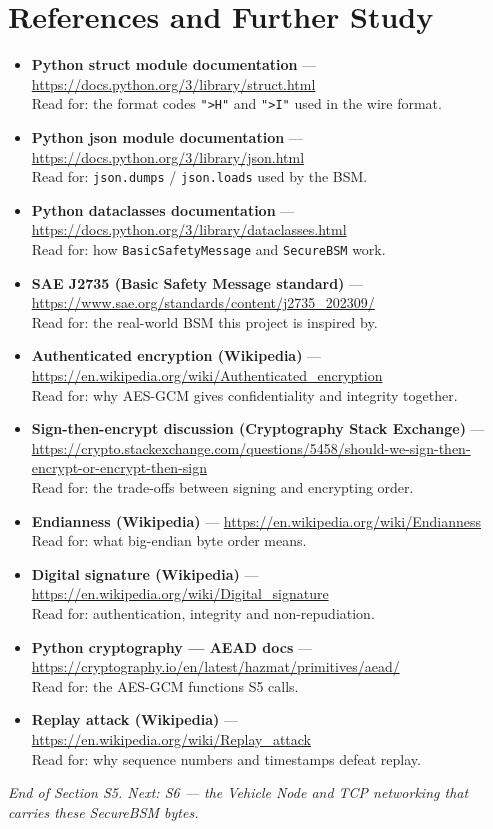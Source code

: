 \documentclass[11pt,a4paper]{article}
\begin{document}
\section{References and Further Study}
\begin{itemize}
  \item \textbf{Python struct module documentation} ---
        \url{https://docs.python.org/3/library/struct.html}\\
        Read for: the format codes \texttt{">H"} and \texttt{">I"} used in the
        wire format.
  \item \textbf{Python json module documentation} ---
        \url{https://docs.python.org/3/library/json.html}\\
        Read for: \texttt{json.dumps} / \texttt{json.loads} used by the BSM.
  \item \textbf{Python dataclasses documentation} ---
        \url{https://docs.python.org/3/library/dataclasses.html}\\
        Read for: how \texttt{BasicSafetyMessage} and \texttt{SecureBSM} work.
  \item \textbf{SAE J2735 (Basic Safety Message standard)} ---
        \url{https://www.sae.org/standards/content/j2735_202309/}\\
        Read for: the real-world BSM this project is inspired by.
  \item \textbf{Authenticated encryption (Wikipedia)} ---
        \url{https://en.wikipedia.org/wiki/Authenticated_encryption}\\
        Read for: why AES-GCM gives confidentiality and integrity together.
  \item \textbf{Sign-then-encrypt discussion (Cryptography Stack Exchange)} ---
        \url{https://crypto.stackexchange.com/questions/5458/should-we-sign-then-encrypt-or-encrypt-then-sign}\\
        Read for: the trade-offs between signing and encrypting order.
  \item \textbf{Endianness (Wikipedia)} ---
        \url{https://en.wikipedia.org/wiki/Endianness}\\
        Read for: what big-endian byte order means.
  \item \textbf{Digital signature (Wikipedia)} ---
        \url{https://en.wikipedia.org/wiki/Digital_signature}\\
        Read for: authentication, integrity and non-repudiation.
  \item \textbf{Python cryptography --- AEAD docs} ---
        \url{https://cryptography.io/en/latest/hazmat/primitives/aead/}\\
        Read for: the AES-GCM functions S5 calls.
  \item \textbf{Replay attack (Wikipedia)} ---
        \url{https://en.wikipedia.org/wiki/Replay_attack}\\
        Read for: why sequence numbers and timestamps defeat replay.
\end{itemize}

\vfill
\begin{center}\footnotesize\itshape
End of Section S5. Next: S6 --- the Vehicle Node and TCP networking that carries
these SecureBSM bytes.
\end{center}
\end{document}
